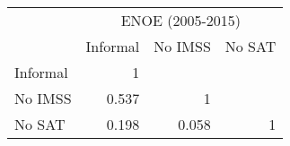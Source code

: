 \begin{tabular}{l|rrr}
\toprule
\multicolumn{1}{r}{} & \multicolumn{3}{c}{ENOE (2005-2015)} \\
\cmidrule{2-4}      & \multicolumn{1}{l}{Informal} & \multicolumn{1}{l}{No IMSS} & \multicolumn{1}{l}{No SAT} \\
\midrule
\midrule
Informal & 1     &       &  \\
No IMSS & 0.537 & 1     &  \\
No SAT & 0.198 & 0.058 & 1 \\
\bottomrule
\bottomrule
\end{tabular}%
